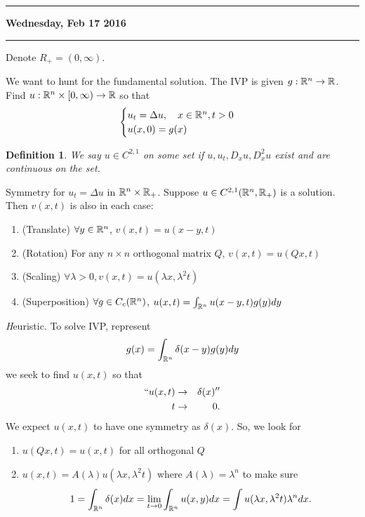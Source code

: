 \documentclass[11pt]{amsart}%
\newtheorem{definition}[theorem]{Definition}
\begin{document}
\begin{center}\rule{0.5\linewidth}{\linethickness}\end{center}

\textbf{Wednesday, Feb 17 2016}

\begin{center}\rule{0.5\linewidth}{\linethickness}\end{center}

Denote $R_+=(0,\infty)$.

We want to hunt for the fundamental solution. The IVP is given $g:\mathbb{R}^n\to \mathbb{R}$. Find $u:\mathbb{R}^n\times [0,\infty)\to \mathbb{R}$ so that
$$\begin{cases}
    u_t=\Delta u, \quad x\in \mathbb{R}^n, t>0\\
    u(x,0) =g(x)
\end{cases}$$  

\begin{definition}
    We say $u\in C^{2,1}$ on some set if $u, u_t, D_xu, D_x^2u$ exist and are continuous on the set.
\end{definition}

Symmetry for $u_t=\Delta u$ in $\mathbb{R}^n\times \mathbb{R}_+$. Suppose $u\in C^{2,1}(\mathbb{R}^n,\mathbb{R}_+)$ is a solution. Then $v(x,t)$ is also in each case:

\begin{enumerate}
    \item (Translate) $\forall y\in \mathbb{R}^n$, $v(x,t)=u(x-y,t)$
    \item (Rotation) For any $n\times n$ orthogonal matrix $Q$, $v(x,t)=u(Qx,t)$
    \item (Scaling) $\forall \lambda >0, v(x,t)=u(\lambda x, \lambda^2 t)$
    \item (Superposition) $\forall g\in C_c(\mathbb{R}^n)$, $u(x,t) =\int_{\mathbb{R}^n} u(x-y,t) g(y) dy$
\end{enumerate}

{\emph Heuristic.} To solve IVP, represent
$$g(x)=\int_{\mathbb{R}^n}\delta(x-y)g(y)dy$$
 we seek to find $u(x,t)$ so that
 \begin{eqnarray*}
    ``u(x,t) &\to& \delta(x)''\\
    t   &\to& 0.
 \end{eqnarray*}
 We expect $u(x,t)$ to have one symmetry as $\delta(x)$. So, we look for
 \begin{enumerate}
     \item $u(Qx,t)=u(x,t)$ for all orthogonal $Q$
     \item $u(x,t) = A(\lambda)u(\lambda x, \lambda^2 t)$ where $A(\lambda)=\lambda^n$ to make sure
     $$1=\int_{\mathbb{R}^n}\delta(x)dx = \lim_{t\to 0}\int_{\mathbb{R}^n} u(x,y) dx =\int u(\lambda x, \lambda^2 t)\lambda^n dx.$$
 \end{enumerate}
 
\end{document}
